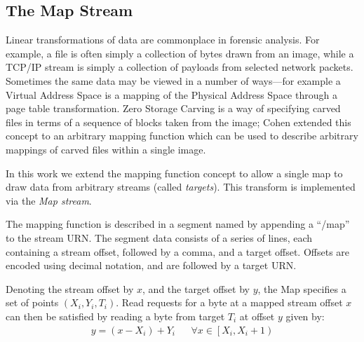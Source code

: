 \documentclass[10pt, conference]{IEEEtran}
\begin{document}


\subsection{The Map Stream}
\label{map_stream}
Linear transformations of data are commonplace in forensic
analysis. For example, a file is often simply a collection of bytes
drawn from an image, while a TCP/IP stream is simply a collection of
payloads from selected network packets. 
Sometimes the same data may be
viewed in a number of ways---for example a Virtual Address Space is a
mapping of the Physical Address Space through a page table
transformation.  Zero Storage Carving \cite{Meijer2006} is a way of
specifying carved files in terms of a sequence of blocks taken from
the image; Cohen extended this concept to an arbitrary
mapping function\cite{Cohen2007} which can be used to describe
arbitrary mappings of carved files within a single image. 

In this work we extend the mapping function concept to allow a single
map to draw data from arbitrary streams (called {\em targets}). This
transform is implemented via the {\em Map stream}.

The mapping function is described in a segment named by appending a
``/map'' to the stream URN. The segment data consists of a series of
lines, each containing a stream offset, followed by a comma, and a
target offset. Offsets are encoded using decimal notation, and are
followed by a target URN.

Denoting the stream offset by $x$, and the target offset by $y$, the
Map specifies a set of points $(X_i,Y_i,T_i)$. Read requests for a
byte at a mapped stream offset $x$ can then be satisfied by reading a
byte from target $T_i$ at offset $y$ given by:
\begin{eqnarray}
y = (x - X_i) + Y_i & &
\forall x \in \left [X_i, X_i+1 \right )
\end{eqnarray}
\end{document}
